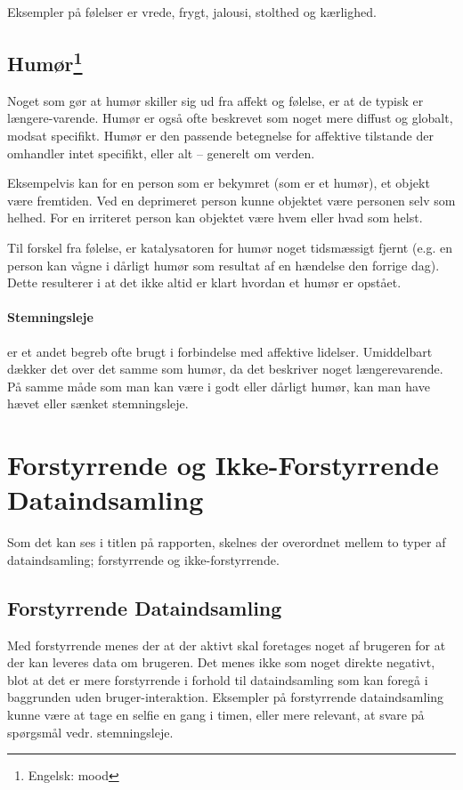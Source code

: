 Eksempler på følelser er vrede, frygt, jalousi, stolthed og kærlighed.

\subsection[Humør]{Humør\footnote{Engelsk: mood}}
Noget som gør at humør skiller sig ud fra affekt og følelse, er at de typisk er længere-varende.
Humør er også ofte beskrevet som noget mere diffust og globalt, modsat specifikt.
Humør er den passende betegnelse for affektive tilstande der omhandler intet specifikt, eller alt -- generelt om verden.

Eksempelvis kan for en person som er bekymret (som er et humør), et objekt være fremtiden.
Ved en deprimeret person kunne objektet være personen selv som helhed.
For en irriteret person kan objektet være hvem eller hvad som helst.

Til forskel fra følelse, er katalysatoren for humør noget tidsmæssigt fjernt (e.g. en person kan vågne i dårligt humør som resultat af en hændelse den forrige dag).
Dette resulterer i at det ikke altid er klart hvordan et humør er opstået.

\paragraph{Stemningsleje} er et andet begreb ofte brugt i forbindelse med affektive lidelser.
Umiddelbart dækker det over det samme som humør, da det beskriver noget længerevarende.
På samme måde som man kan være i godt eller dårligt humør, kan man have hævet eller sænket stemningsleje.

\section{Forstyrrende og Ikke-Forstyrrende Dataindsamling}
Som det kan ses i titlen på rapporten, skelnes der overordnet mellem to typer af dataindsamling; forstyrrende og ikke-forstyrrende.

\subsection{Forstyrrende Dataindsamling}
Med forstyrrende menes der at der aktivt skal foretages noget af brugeren for at der kan leveres data om brugeren.
Det menes ikke som noget direkte negativt, blot at det er mere forstyrrende i forhold til dataindsamling som kan foregå i baggrunden uden bruger-interaktion.
Eksempler på forstyrrende dataindsamling kunne være at tage en selfie en gang i timen, eller mere relevant, at svare på spørgsmål vedr. stemningsleje.

